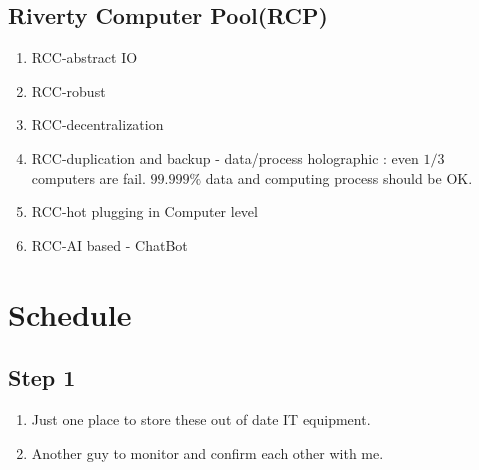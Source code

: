 \documentclass[a4paper,11pt]{article}
\begin{document}
\subsection{Riverty Computer Pool(RCP)}
\begin{enumerate}
	\item RCC-abstract IO
	\item RCC-robust
	\item RCC-decentralization
	\item RCC-duplication and backup - data/process holographic : even $1/3$ computers are fail. $99.999\%$ data and computing process should be OK.
	\item RCC-hot plugging in Computer level
	\item RCC-AI based - ChatBot
\end{enumerate}


\section{Schedule}
\subsection{Step 1}
\begin{enumerate}
\item Just one place to store these out of date IT equipment.
\item Another guy to monitor and confirm each other with me.
\end{enumerate}

\appendix
\end{document}
